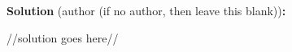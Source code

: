 
\begin{solution}
\textbf{Solution} (author (if no author, then leave this blank))\textbf{:}\V

//solution goes here//
\end{solution}\V